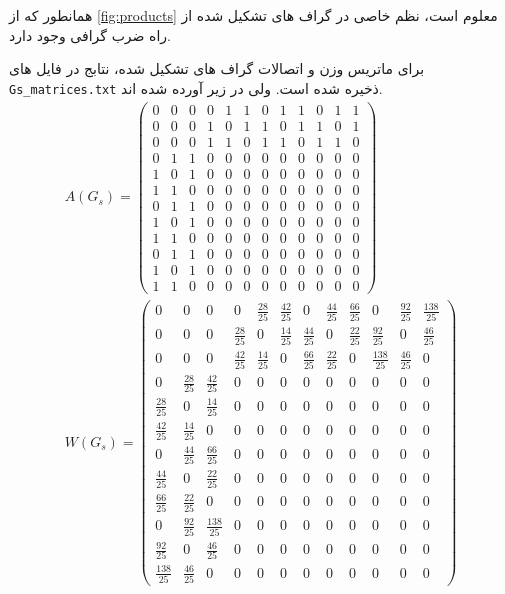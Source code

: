 همانطور که از \ref*{fig:products} معلوم است، نظم خاصی در گراف های تشکیل شده از راه ضرب گرافی وجود دارد.

برای ماتریس وزن و اتصالات گراف های تشکیل شده، نتابج در فایل های \texttt{Gs\_matrices.txt} ذخیره شده است. ولی در زیر آورده شده اند.
{
\vfil
\small
\begin{gather*}
	A(G_s)=\left(\begin{array}{cccccccccccc} 0 & 0 & 0 & 0 & 1 & 1 & 0 & 1 & 1 & 0 & 1 & 1\\ 0 & 0 & 0 & 1 & 0 & 1 & 1 & 0 & 1 & 1 & 0 & 1\\ 0 & 0 & 0 & 1 & 1 & 0 & 1 & 1 & 0 & 1 & 1 & 0\\ 0 & 1 & 1 & 0 & 0 & 0 & 0 & 0 & 0 & 0 & 0 & 0\\ 1 & 0 & 1 & 0 & 0 & 0 & 0 & 0 & 0 & 0 & 0 & 0\\ 1 & 1 & 0 & 0 & 0 & 0 & 0 & 0 & 0 & 0 & 0 & 0\\ 0 & 1 & 1 & 0 & 0 & 0 & 0 & 0 & 0 & 0 & 0 & 0\\ 1 & 0 & 1 & 0 & 0 & 0 & 0 & 0 & 0 & 0 & 0 & 0\\ 1 & 1 & 0 & 0 & 0 & 0 & 0 & 0 & 0 & 0 & 0 & 0\\ 0 & 1 & 1 & 0 & 0 & 0 & 0 & 0 & 0 & 0 & 0 & 0\\ 1 & 0 & 1 & 0 & 0 & 0 & 0 & 0 & 0 & 0 & 0 & 0\\ 1 & 1 & 0 & 0 & 0 & 0 & 0 & 0 & 0 & 0 & 0 & 0 \end{array}\right)\\
	W(G_s)=\left(\begin{array}{cccccccccccc} 0 & 0 & 0 & 0 & \frac{28}{25} & \frac{42}{25} & 0 & \frac{44}{25} & \frac{66}{25} & 0 & \frac{92}{25} & \frac{138}{25}\\ 0 & 0 & 0 & \frac{28}{25} & 0 & \frac{14}{25} & \frac{44}{25} & 0 & \frac{22}{25} & \frac{92}{25} & 0 & \frac{46}{25}\\ 0 & 0 & 0 & \frac{42}{25} & \frac{14}{25} & 0 & \frac{66}{25} & \frac{22}{25} & 0 & \frac{138}{25} & \frac{46}{25} & 0\\ 0 & \frac{28}{25} & \frac{42}{25} & 0 & 0 & 0 & 0 & 0 & 0 & 0 & 0 & 0\\ \frac{28}{25} & 0 & \frac{14}{25} & 0 & 0 & 0 & 0 & 0 & 0 & 0 & 0 & 0\\ \frac{42}{25} & \frac{14}{25} & 0 & 0 & 0 & 0 & 0 & 0 & 0 & 0 & 0 & 0\\ 0 & \frac{44}{25} & \frac{66}{25} & 0 & 0 & 0 & 0 & 0 & 0 & 0 & 0 & 0\\ \frac{44}{25} & 0 & \frac{22}{25} & 0 & 0 & 0 & 0 & 0 & 0 & 0 & 0 & 0\\ \frac{66}{25} & \frac{22}{25} & 0 & 0 & 0 & 0 & 0 & 0 & 0 & 0 & 0 & 0\\ 0 & \frac{92}{25} & \frac{138}{25} & 0 & 0 & 0 & 0 & 0 & 0 & 0 & 0 & 0\\ \frac{92}{25} & 0 & \frac{46}{25} & 0 & 0 & 0 & 0 & 0 & 0 & 0 & 0 & 0\\ \frac{138}{25} & \frac{46}{25} & 0 & 0 & 0 & 0 & 0 & 0 & 0 & 0 & 0 & 0 \end{array}\right)\\

\end{gather*}}

